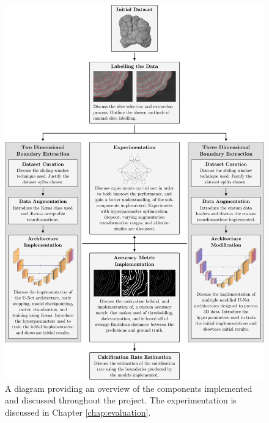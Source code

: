 \begin{figure}[!p]
    \centering
    \includegraphics[width=\textwidth]{images/overview.pdf}
    \caption{A diagram providing an overview of the components implemented and discussed throughout the project. The experimentation is discussed in Chapter \ref{chap:evaluation}.}
    \label{fig:overview}
\end{figure}

